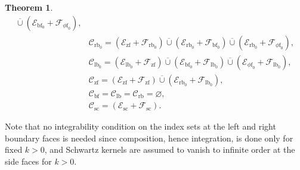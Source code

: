 \documentclass[11pt]{article}
\numberwithin{equation}{section}
\theoremstyle{plain}
\newtheorem{Th}{Theorem}[section]
\theoremstyle{definition}
\newcommand{\phif}{{\phi\mathrm{f}}}
\newcommand{\lf}{{\mathrm{lb}}}
\newcommand{\rf}{{\mathrm{rb}}}
\newcommand{\lfz}{{\mathrm{lb}_0}}
\newcommand{\rfz}{{\mathrm{rb}_0}}
\newcommand{\bbf}{{\mathrm{bf}}}
\newcommand{\bfz}{{\bbf_0}}
\newcommand{\ssc}{{\mathrm{sc}}}
\newcommand{\zf}{{\mathrm{zf}}}
\begin{document}
\begin{Th}
\begin{equation}
\begin{split}
\overline{\cup} (\mathcal{E}_{\bbf_0} + \mathcal{F}_{\phif_0}), \\
&\mathscr{C}_{\rfz} =
(\mathcal{E}_{\zf} + \mathcal{F}_{\rfz})
\overline{\cup} (\mathcal{E}_{\rfz}+ \mathcal{F}_{\bfz})
\overline{\cup} (\mathcal{E}_{\rfz}+\mathcal{F}_{\phif_0}),\\
&\mathscr{C}_{\lf_{0}} = (\mathcal{E}_{\lf_0}+
\mathcal{F}_{\zf}) \overline{\cup}
(\mathcal{E}_{\bfz}+\mathcal{F}_{\lfz}) \overline{\cup}
(\mathcal{E}_{\phif_0}+ \mathcal{F}_{\lfz}),\\
&\mathscr{C}_{\zf} = (\mathcal{E}_{\zf}+ \mathcal{F}_{\zf}) \overline{\cup}
(\mathcal{E}_{\rfz}+ \mathcal{F}_{\lfz}), \\
&\mathscr{C}_{\bbf} =
\mathscr{C}_{\lf} = \mathscr{C}_{\rf}
= \varnothing, \\
&\mathscr{C}_{\ssc} = (\mathcal{E}_{\ssc} + \mathcal{F}_{\ssc}).
\end{split}
\end{equation}
\end{Th}
{Note that no integrability condition on the index sets at the left and right boundary faces is needed since composition, hence integration, is done only for fixed $k>0$, and Schwartz kernels are assumed to vanish to infinite order at the side faces for $k>0$.}
\end{document}
